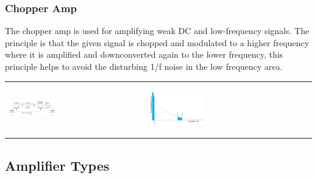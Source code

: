 		\subsubsection{Chopper Amp}
			The chopper amp is used for amplifying weak DC and low-frequency signals. The principle is that the given signal is chopped and modulated to a higher frequency where it is amplified and downconverted again to the lower frequency, this principle helps to avoid the disturbing 1/f noise in the low frequency area. 
			
			\begin{table}[h!]
				\centering
				\begin{tabular}{m{} m{} }
					
					\begin{center}\includegraphics[width=0.35\textwidth]{images/ChopperAmp.png}\end{center} 
				&
							
					\begin{center}\includegraphics[width=0.35\textwidth]{images/Chopperrauschen.png}\end{center} 
				\\
			
				\end{tabular}
			\end{table}			
		
	\subsection{Amplifier Types}
